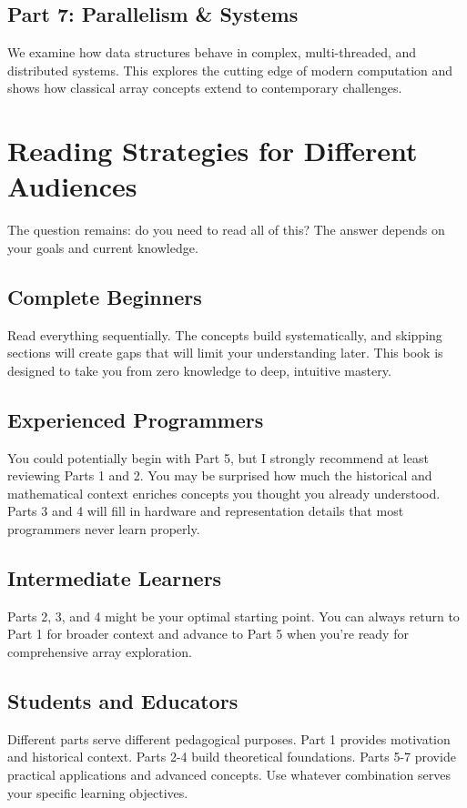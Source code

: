 \subsection*{Part 7: Parallelism \& Systems}
We examine how data structures behave in complex, multi-threaded, and distributed systems. This explores the cutting edge of modern computation and shows how classical array concepts extend to contemporary challenges.\\

\section*{Reading Strategies for Different Audiences}

The question remains: do you need to read all of this? The answer depends on your goals and current knowledge.

\subsection*{Complete Beginners}
Read everything sequentially. The concepts build systematically, and skipping sections will create gaps that will limit your understanding later. This book is designed to take you from zero knowledge to deep, intuitive mastery.

\subsection*{Experienced Programmers}
You could potentially begin with Part 5, but I strongly recommend at least reviewing Parts 1 and 2. You may be surprised how much the historical and mathematical context enriches concepts you thought you already understood. Parts 3 and 4 will fill in hardware and representation details that most programmers never learn properly.

\subsection*{Intermediate Learners}
Parts 2, 3, and 4 might be your optimal starting point. You can always return to Part 1 for broader context and advance to Part 5 when you're ready for comprehensive array exploration.

\subsection*{Students and Educators}
Different parts serve different pedagogical purposes. Part 1 provides motivation and historical context. Parts 2-4 build theoretical foundations. Parts 5-7 provide practical applications and advanced concepts. Use whatever combination serves your specific learning objectives.\\

